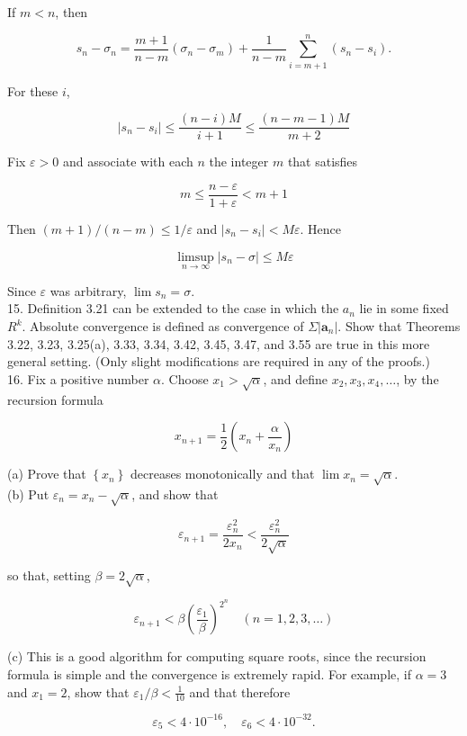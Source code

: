 \documentclass[10pt]{article}
\begin{document}
If $m<n$, then

$$
s_{n}-\sigma_{n}=\frac{m+1}{n-m}\left(\sigma_{n}-\sigma_{m}\right)+\frac{1}{n-m} \sum_{i=m+1}^{n}\left(s_{n}-s_{i}\right) .
$$

For these $i$,

$$
\left|s_{n}-s_{i}\right| \leq \frac{(n-i) M}{i+1} \leq \frac{(n-m-1) M}{m+2}
$$

Fix $\varepsilon>0$ and associate with each $n$ the integer $m$ that satisfies

$$
m \leq \frac{n-\varepsilon}{1+\varepsilon}<m+1
$$

Then $(m+1) /(n-m) \leq 1 / \varepsilon$ and $\left|s_{n}-s_{i}\right|<M \varepsilon$. Hence

$$
\limsup _{n \rightarrow \infty}\left|s_{n}-\sigma\right| \leq M \varepsilon
$$

Since $\varepsilon$ was arbitrary, $\lim s_{n}=\sigma$.\\
15. Definition 3.21 can be extended to the case in which the $a_{n}$ lie in some fixed $R^{k}$. Absolute convergence is defined as convergence of $\Sigma\left|\mathbf{a}_{n}\right|$. Show that Theorems 3.22, 3.23, 3.25(a), 3.33, 3.34, 3.42, 3.45, 3.47, and 3.55 are true in this more general setting. (Only slight modifications are required in any of the proofs.)\\
16. Fix a positive number $\alpha$. Choose $x_{1}>\sqrt{\alpha}$, and define $x_{2}, x_{3}, x_{4}, \ldots$, by the recursion formula

$$
x_{n+1}=\frac{1}{2}\left(x_{n}+\frac{\alpha}{x_{n}}\right)
$$

(a) Prove that $\left\{x_{n}\right\}$ decreases monotonically and that $\lim x_{n}=\sqrt{\alpha}$.\\
(b) Put $\varepsilon_{n}=x_{n}-\sqrt{\alpha}$, and show that

$$
\varepsilon_{n+1}=\frac{\varepsilon_{n}^{2}}{2 x_{n}}<\frac{\varepsilon_{n}^{2}}{2 \sqrt{\alpha}}
$$

so that, setting $\beta=2 \sqrt{\alpha}$,

$$
\varepsilon_{n+1}<\beta\left(\frac{\varepsilon_{1}}{\beta}\right)^{2^{n}} \quad(n=1,2,3, \ldots)
$$

(c) This is a good algorithm for computing square roots, since the recursion formula is simple and the convergence is extremely rapid. For example, if $\alpha=3$ and $x_{1}=2$, show that $\varepsilon_{1} / \beta<\frac{1}{10}$ and that therefore

$$
\varepsilon_{5}<4 \cdot 10^{-16}, \quad \varepsilon_{6}<4 \cdot 10^{-32} .
$$
\end{document}
